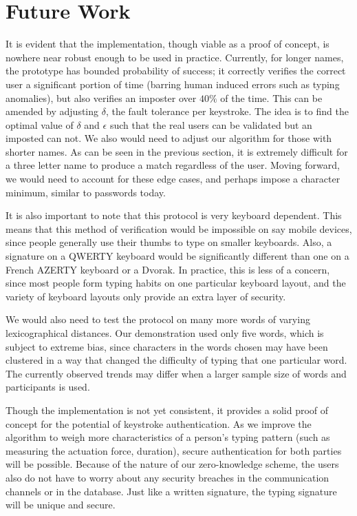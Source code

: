 \documentclass[11pt]{article}
\begin{document}
\section{Future Work}
\label{sec:future}
It is evident that the implementation, though viable as a proof of concept, is nowhere near robust enough to be used in practice.  Currently, for longer names, the prototype has bounded probability of success; it correctly verifies the correct user a significant portion of time (barring human induced errors such as typing anomalies), but also verifies an imposter over $40\%$ of the time.  This can be amended by adjusting $\delta$, the fault tolerance per keystroke.  The idea is to find the optimal value of $\delta$ and $\epsilon$ such that the real users can be validated but an imposted can not.  We also would need to adjust our algorithm for those with shorter names.  As can be seen in the previous section, it is extremely difficult for a three letter name to produce a match regardless of the user.  Moving forward, we would need to account for these edge cases, and perhaps impose a character minimum, similar to passwords today.

It is also important to note that this protocol is very keyboard dependent. This means that this method of verification would be impossible on say mobile devices, since people generally use their thumbs to type on smaller keyboards.  Also, a signature on a QWERTY keyboard would be significantly different than one on a French AZERTY keyboard or a Dvorak. In practice, this is less of a concern, since most people form typing habits on one particular keyboard layout, and the variety of keyboard layouts only provide an extra layer of security.

We would also need to test the protocol on many more words of varying lexicographical distances. Our demonstration used only five words, which is subject to extreme bias, since characters in the words chosen may have been clustered in a way that changed the difficulty of typing that one particular word.  The currently observed trends may differ when a larger sample size of words and participants is used.

Though the implementation is not yet consistent, it provides a solid proof of concept for the potential of keystroke authentication.  As we improve the algorithm to weigh more characteristics of a person's typing pattern (such as measuring the actuation force, duration), secure authentication for both parties will be possible. Because of the nature of our zero-knowledge scheme, the users also do not have to worry about any security breaches in the communication channels or in the database. Just like a written signature, the typing signature will be unique and secure.




\end{document}
